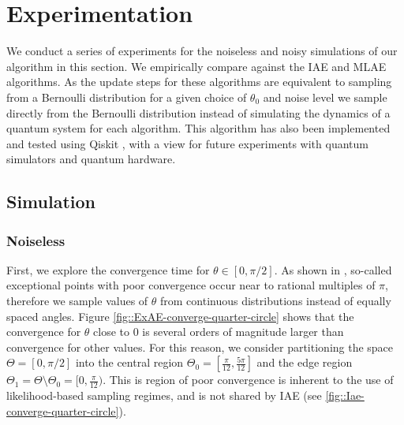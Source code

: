 \section{Experimentation} \label{sec::experiments}
We conduct a series of experiments for the noiseless and noisy simulations of our algorithm in this section. We empirically compare against the IAE and MLAE algorithms. As the update steps for these algorithms are equivalent to sampling from a Bernoulli distribution for a given choice of $\theta_0$ and noise level we sample directly from the Bernoulli distribution instead of simulating the dynamics of a quantum system for each algorithm. This algorithm has also been implemented and tested using Qiskit \cite{Qiskit}, with a view for future experiments with quantum simulators and quantum hardware.


\subsection{Simulation}
\subsubsection{Noiseless}
First, we explore the convergence time for $\theta \in [0, \pi/2]$. As shown in \cite{callison_2022_amp_with_jitter}, so-called exceptional points with poor convergence occur near to rational multiples of $\pi$, therefore we sample values of $\theta$ from continuous distributions instead of equally spaced angles. Figure \ref{fig::ExAE-converge-quarter-circle} shows that the convergence for $\theta$ close to $0$ is several orders of magnitude larger than convergence for other values. For this reason, we consider partitioning the space $\Theta = [0, \pi/2]$ into the central region $\Theta_0 = [\frac{\pi}{12}, \frac{5 \pi}{12}]$ and the edge region $\Theta_1 = \Theta \setminus \Theta_0 = [0, \frac{\pi}{12})$. This is region of poor convergence is inherent to the use of likelihood-based sampling regimes, and is not shared by IAE (see \ref{fig::Iae-converge-quarter-circle}).

